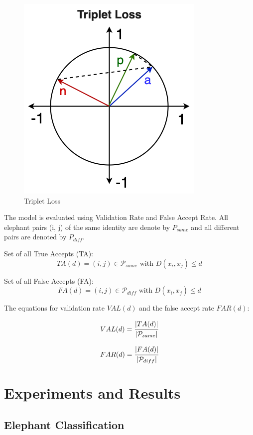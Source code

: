 \documentclass[10pt,twocolumn,letterpaper]{article}
\begin{document}
\begin{figure}[t]
  \centering
  \includegraphics[scale=0.275]{triplet_loss}
   \caption{Triplet Loss}
   \label{fig:triplet_loss}
\end{figure}


The model is evaluated using Validation Rate and False Accept Rate.  All elephant pairs (i, j) of the same identity are denote by $P_{same}$ and all different pairs are denoted by $P_{diff}$. \cite{Facenet} 

Set of all True Accepts (TA): 
$$
TA(d) = {(i,j) \in \mathcal{P}_{same} \text{ with } D(x_i, x_j) \le d} 
$$

Set of all False Accepts (FA): 
$$
FA(d) = {(i,j) \in \mathcal{P}_{diff} \text{ with } D(x_i, x_j) \le d} 
$$


The equations for validation rate $VAL(d)$ and the false accept rate $FAR(d)$:

$$
VAL(d) = \cfrac{|TA(d)|}{|\mathcal{P}_{same}|}
$$

$$
FAR(d) = \cfrac{|FA(d)|}{|\mathcal{P}_{diff}|}
$$




\section{Experiments and Results}
\label{sec:expresults} 

\subsection{Elephant Classification}
\end{document}
